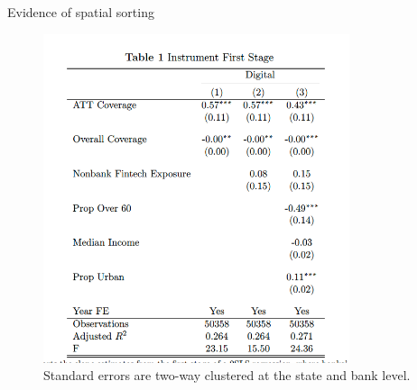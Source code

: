 \documentclass[notes,10pt, aspectratio=169]{beamer}
\begin{document}
    \begin{frame}{Evidence of spatial sorting}

        \begin{figure}
            \centering
            \includegraphics[width=0.8\textwidth]{imgs/tab1.png}
            \caption*{ Standard errors  
            are two-way clustered at the state and bank level.}
            \label{fig:my_label}
        \end{figure}
        
        \end{frame}
    
\end{document}
